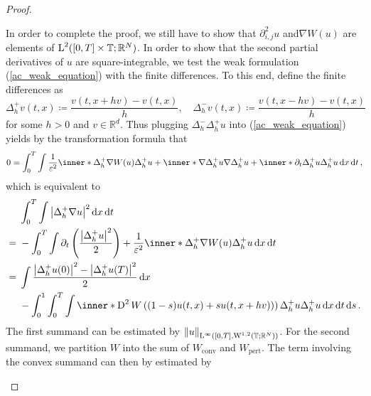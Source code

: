\begin{proof}
\begin{description}[wide=0pt]
	In order to complete the proof, we still have to show that $ \partial_{ i , j }^{ 2 } u$ and$ \nabla W ( u) $ are elements of $ \operatorname{L}^{ 2 } ( [ 0 , T ] \times \operatorname{\mathbb{T}} ; \mathbb{ R }^{ N } ) $.
	In order to show that the second partial derivatives of $ u $ are square-integrable, we test the weak formulation (\ref{ac_weak_equation}) with the finite differences. To this end, define the finite differences as
	\begin{equation*}
		\Delta_{ h }^{ + } v ( t , x ) \coloneqq \frac{ v ( t , x + h v ) - v ( t , x ) }{ h },
		\quad
		\Delta_{ h }^{ - } v ( t , x ) \coloneqq \frac{ v ( t , x - h v ) - v ( t , x ) }{ h }
	\end{equation*}
	for some $ h > 0 $ and $ v \in \mathbb{ R }^{ d } $. Thus plugging $ \Delta_{ h }^{ - } \Delta_{ h }^{ + } u $ into (\ref{ac_weak_equation}) yields by the transformation formula that
	\begin{equation*}
		0
		=
		\int_{ 0 }^{ T }
			\int
				\frac{ 1 }{ \varepsilon^{ 2 } }
				\inner*{ \Delta_{ h }^{ + } \nabla W ( u ) }{ \Delta_{ h }^{ + } u }
				+
				\inner*{ \nabla \Delta_{ h }^{ + } u }{ \nabla \Delta_{ h }^{ + } u }
				+
				\inner*{ \partial_{ t } \Delta_{ h }^{ + } u }{ \Delta_{ h }^{ + } u }
			\dd{ x }
		\dd{ t },
	\end{equation*}
	which is equivalent to
	\begin{align*}
		& \int_{ 0 }^{ T }
			\int
				\abs{ \Delta_{ h }^{ + } \nabla u }^{ 2 }
			\dd{ x }
		\dd{ t }
		\\
		={} &
		-
		\int_{ 0 }^{ T }
			\int
				\partial_{ t } \left( \frac{ \abs{ \Delta_{ h }^{ + } u }^{ 2 } }{ 2 } \right)
				+
				\frac{ 1 }{ \varepsilon^{ 2 } }
				\inner*{ \Delta_{ h }^{ + } \nabla W ( u ) }{ \Delta_{ h }^{ + } u }
			\dd{ x }
		\dd{ t }
		\\
		={} &
		\int  
			\frac{ \abs{ \Delta_{ h }^{ + } u ( 0 ) }^{ 2 } - \abs{ \Delta_{ h }^{ + } u ( T ) }^{ 2 } }{ 2 }
		\dd{ x }
		\\
		& -
		\int_{ 0 }^{ 1 }
			\int_{ 0 }^{ T }
				\int
					\inner*{ 
						\diff^{ 2 } W \left( ( 1 - s ) u ( t, x  ) + s u( t,  x + h v ) ) \right) 
						\Delta_{ h }^{ + } u
					}{
					\Delta_{ h }^{ + } u 
					}
				\dd{ x }
			\dd{ t }
		\dd{ s }.
	\end{align*}
	The first summand can be estimated by $ \norm{ u }_{ \operatorname{L}^{ \infty } ( [0 , T ] , \operatorname{W}^{ 1 , 2 } ( \operatorname{\mathbb{T}} ; \mathbb{ R }^{ N } ) ) } $. For the second summand, we partition $ W $ into the sum of $ W_{ \mathrm{conv} } $ and $ W_{ \mathrm{pert} } $. The term involving the convex summand can then by estimated by

\end{description}
\end{proof}
